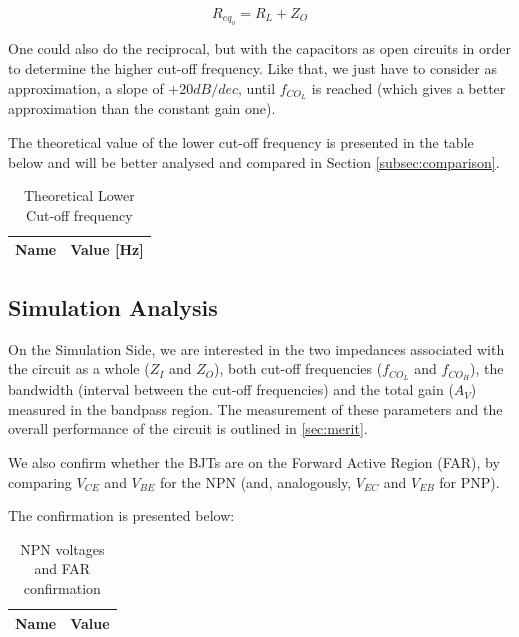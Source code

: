 \begin{equation}
    R_{eq_o}=R_L+Z_{O}
\end{equation}

One could also do the reciprocal, but with the capacitors as open circuits in order to determine the higher cut-off frequency.
Like that, we just have to consider as approximation, a slope of $+20dB/dec$, until $f_{CO_L}$ is reached (which gives a better approximation than the constant gain one).

The theoretical value of the lower cut-off frequency is presented in the table below and will be better analysed and compared in Section \ref{subsec:comparison}.

\begin{table}[h]
    \centering
    \begin{tabular}{|l|c|}
    \hline
    {\bf Name} & {\bf Value [Hz]} \\ \hline
    
    \end{tabular}
    \caption{Theoretical Lower Cut-off frequency}
    \label{tab:theo_CO_freq}
\end{table}

\pagebreak

\subsection{Simulation Analysis}
\label{subsec:Req}

On the Simulation Side, we are interested in the two impedances associated with the circuit as a whole ($Z_I$ and $Z_O$), both cut-off frequencies ($f_{CO_L}$ and $f_{CO_H}$), the bandwidth (interval between the cut-off frequencies) and the total gain ($A_V$) measured in the bandpass region. The measurement of these parameters and the overall performance of the circuit is outlined in \ref{sec:merit}.

We also confirm whether the BJTs are on the Forward Active Region (FAR), by comparing $V_{CE}$ and $V_{BE}$ for the NPN (and, analogously, $V_{EC}$ and $V_{EB}$ for PNP). 

The confirmation is presented below:

\begin{table}[h]
    \centering
    \begin{tabular}{|c|c|}
    \hline
    {\bf Name} & {\bf Value} \\ \hline
    
    \end{tabular}
    \caption{NPN voltages and FAR confirmation}
    \label{tab:NPN}
\end{table}

